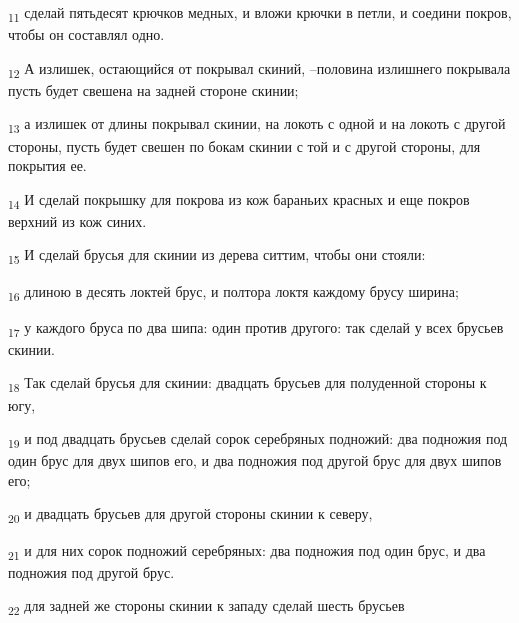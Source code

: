 \begin{tcolorbox}
\textsubscript{11} сделай пятьдесят крючков медных, и вложи крючки в петли, и соедини покров, чтобы он составлял одно.
\end{tcolorbox}
\begin{tcolorbox}
\textsubscript{12} А излишек, остающийся от покрывал скиний, --половина излишнего покрывала пусть будет свешена на задней стороне скинии;
\end{tcolorbox}
\begin{tcolorbox}
\textsubscript{13} а излишек от длины покрывал скинии, на локоть с одной и на локоть с другой стороны, пусть будет свешен по бокам скинии с той и с другой стороны, для покрытия ее.
\end{tcolorbox}
\begin{tcolorbox}
\textsubscript{14} И сделай покрышку для покрова из кож бараньих красных и еще покров верхний из кож синих.
\end{tcolorbox}
\begin{tcolorbox}
\textsubscript{15} И сделай брусья для скинии из дерева ситтим, чтобы они стояли:
\end{tcolorbox}
\begin{tcolorbox}
\textsubscript{16} длиною в десять локтей брус, и полтора локтя каждому брусу ширина;
\end{tcolorbox}
\begin{tcolorbox}
\textsubscript{17} у каждого бруса по два шипа: один против другого: так сделай у всех брусьев скинии.
\end{tcolorbox}
\begin{tcolorbox}
\textsubscript{18} Так сделай брусья для скинии: двадцать брусьев для полуденной стороны к югу,
\end{tcolorbox}
\begin{tcolorbox}
\textsubscript{19} и под двадцать брусьев сделай сорок серебряных подножий: два подножия под один брус для двух шипов его, и два подножия под другой брус для двух шипов его;
\end{tcolorbox}
\begin{tcolorbox}
\textsubscript{20} и двадцать брусьев для другой стороны скинии к северу,
\end{tcolorbox}
\begin{tcolorbox}
\textsubscript{21} и для них сорок подножий серебряных: два подножия под один брус, и два подножия под другой брус.
\end{tcolorbox}
\begin{tcolorbox}
\textsubscript{22} для задней же стороны скинии к западу сделай шесть брусьев
\end{tcolorbox}
